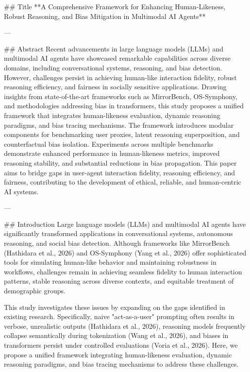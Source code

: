 ## Title  
**A Comprehensive Framework for Enhancing Human-Likeness, Robust Reasoning, and Bias Mitigation in Multimodal AI Agents**  

---

## Abstract  
Recent advancements in large language models (LLMs) and multimodal AI agents have showcased remarkable capabilities across diverse domains, including conversational systems, reasoning, and bias detection. However, challenges persist in achieving human-like interaction fidelity, robust reasoning efficiency, and fairness in socially sensitive applications. Drawing insights from state-of-the-art frameworks such as MirrorBench, OS-Symphony, and methodologies addressing bias in transformers, this study proposes a unified framework that integrates human-likeness evaluation, dynamic reasoning paradigms, and bias tracing mechanisms. The framework introduces modular components for benchmarking user proxies, latent reasoning superposition, and counterfactual bias isolation. Experiments across multiple benchmarks demonstrate enhanced performance in human-likeness metrics, improved reasoning stability, and substantial reductions in bias propagation. This paper aims to bridge gaps in user-agent interaction fidelity, reasoning efficiency, and fairness, contributing to the development of ethical, reliable, and human-centric AI systems.  

---

## Introduction  
Large language models (LLMs) and multimodal AI agents have significantly transformed applications in conversational systems, autonomous reasoning, and social bias detection. Although frameworks like MirrorBench (Hathidara et al., 2026) and OS-Symphony (Yang et al., 2026) offer sophisticated tools for simulating human-like behavior and maintaining robustness in workflows, challenges remain in achieving seamless fidelity to human interaction patterns, stable reasoning across diverse contexts, and equitable treatment of demographic groups.  

This study investigates these issues by expanding on the gaps identified in existing research. Specifically, naive "act-as-a-user" prompting often results in verbose, unrealistic outputs (Hathidara et al., 2026), reasoning models frequently collapse semantically during tokenization (Wang et al., 2026), and biases in transformers persist under controlled evaluations (Voria et al., 2026). Here, we propose a unified framework integrating human-likeness evaluation, dynamic reasoning paradigms, and bias tracing mechanisms to address these challenges.  

